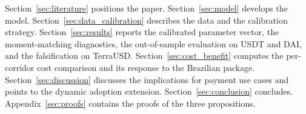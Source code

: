 Section~\ref{sec:literature} positions the paper. Section~\ref{sec:model} develops the model. Section~\ref{sec:data_calibration} describes the data and the calibration strategy. Section~\ref{sec:results} reports the calibrated parameter vector, the moment-matching diagnostics, the out-of-sample evaluation on USDT and DAI, and the falsification on TerraUSD. Section~\ref{sec:cost_benefit} computes the per-corridor cost comparison and its response to the Brazilian package. Section~\ref{sec:discussion} discusses the implications for payment use cases and points to the dynamic adoption extension. Section~\ref{sec:conclusion} concludes. Appendix~\ref{sec:proofs} contains the proofs of the three propositions.
